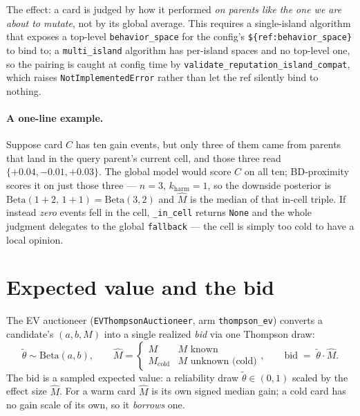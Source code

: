 \documentclass[11pt]{article}
\newcommand{\code}[1]{\texttt{\small #1}}
\newcommand{\Beta}{\mathrm{Beta}}
\begin{document}
The effect: a card is judged by how it performed \emph{on parents like the one we
are about to mutate}, not by its global average. This requires a single-island
algorithm that exposes a top-level \code{behavior\_space} for the config's
\code{\$\{ref:behavior\_space\}} to bind to; a \code{multi\_island} algorithm has
per-island spaces and no top-level one, so the pairing is caught at config time by
\code{validate\_reputation\_island\_compat}, which raises \code{NotImplementedError}
rather than let the ref silently bind to nothing.

\paragraph{A one-line example.} Suppose card $C$ has ten gain events, but only three
of them came from parents that land in the query parent's current cell, and those
three read $\{+0.04, -0.01, +0.03\}$. The global model would score $C$ on all ten;
BD-proximity scores it on just those three --- $n=3$, $k_{\text{harm}}=1$, so the
downside posterior is $\Beta(1+2,\,1+1)=\Beta(3,2)$ and $\hat M$ is the median of
that in-cell triple. If instead \emph{zero} events fell in the cell, \code{\_in\_cell}
returns \code{None} and the whole judgment delegates to the global \code{fallback} ---
the cell is simply too cold to have a local opinion.

\section{Expected value and the bid}
\label{sec:ev}

The EV auctioneer (\code{EVThompsonAuctioneer}, arm \code{thompson\_ev}) converts a
candidate's $(a,b,M)$ into a single realized \emph{bid} via one Thompson draw:
\[
  \tilde\theta \sim \Beta(a,b),
  \qquad
  \hat M = \begin{cases} M & M \text{ known} \\
                         M_{\text{cold}} & M \text{ unknown (cold)} \end{cases},
  \qquad
  \text{bid} \;=\; \tilde\theta \cdot \hat M .
\]
The bid is a sampled expected value: a reliability draw $\tilde\theta \in (0,1)$
scaled by the effect size $\hat M$. For a warm card $\hat M$ is its own signed
median gain; a cold card has no gain scale of its own, so it \emph{borrows} one.
\end{document}
